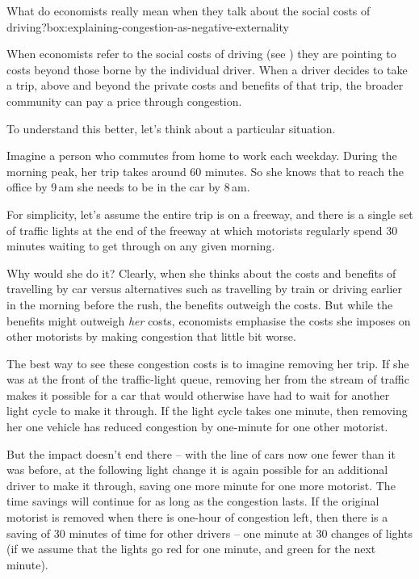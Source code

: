 \documentclass{grattan}
\begin{document}
\begin{bigbox*}{What do economists really mean when they talk about the social costs of driving?}{box:explaining-congestion-as-negative-externality}

When economists refer to the social costs of driving (see ) they are pointing to costs beyond those borne by the individual driver.
When a driver decides to take a trip, above and beyond the private costs and benefits of that trip, the broader community can pay a price through congestion.

To understand this better, let's think about a particular situation.

Imagine a person who commutes from home to work each weekday.
During the morning peak, her trip takes around 60 minutes.
So she knows that to reach the office by 9\,am she needs to be in the car by 8\,am.

For simplicity, let's assume the entire trip is on a freeway, and there is a single set of traffic lights at the end of the freeway at which motorists regularly spend 30 minutes waiting to get through on any given morning.

Why would she do it? Clearly, when she thinks about the costs and benefits of travelling by car versus alternatives such as travelling by train or driving  earlier in the morning before the rush, the benefits outweigh the costs.
But while the benefits might outweigh \textit{her} costs, economists emphasise the costs she imposes on other motorists by making congestion that little bit worse.

The best way to see these congestion costs is to imagine removing her trip.
If she was at the front of the traffic-light queue, removing her from the stream of traffic makes it possible for a car that would otherwise have had to wait for another light cycle to make it through.
If the light cycle takes one minute, then removing her one vehicle has reduced congestion by one-minute for one other motorist.

But the impact doesn't end there – with the line of cars now one fewer than it was before, at the following light change it is again possible for an additional driver to make it through, saving one more minute for one more motorist.
The time savings will continue for as long as the congestion lasts.
If the original motorist is removed when there is one-hour of congestion left, then there is a saving of 30 minutes of time for other drivers – one minute at 30 changes of lights (if we assume that the lights go red for one minute, and green for the next minute).


\end{bigbox*}
\end{document}

